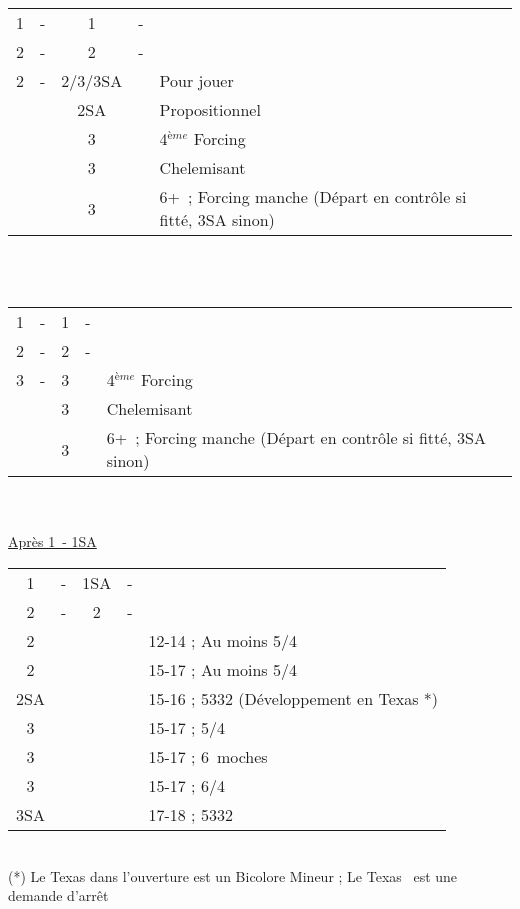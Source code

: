 \documentclass[a4paper, oneside, 11pt]{report}
\begin{document}
		\begin{tabular}{cccc|l}
		1\coeur & - & 1\pique & - &\\
		2\trefle & - & 2\carreau & - &\\
		2\coeur & - & 2\pique/3\trefle/3SA && Pour jouer\\
		&& 2SA && Propositionnel\\
		&& 3\carreau && 4$^{ème}$ Forcing\\
		&& 3\coeur && Chelemisant \coeur\\
		&& 3\pique && 6+\pique\ ; Forcing manche (Départ en contrôle si fitté, 3SA sinon)\\
		\end{tabular}\\\\

		\begin{tabular}{cccc|l}
		1\coeur & - & 1\pique & - &\\
		2\trefle & - & 2\carreau & - &\\
		3\trefle & - & 3\carreau && 4$^{ème}$ Forcing\\
		&& 3\coeur && Chelemisant \coeur\\
		&& 3\pique && 6+\pique\ ; Forcing manche (Départ en contrôle si fitté, 3SA sinon)\\
		\end{tabular}\\\\

		\underline{Après 1\coeur\ - 1SA}

		\begin{tabular}{cccc|l}
		1\coeur & - & 1SA & - &\\
		2\trefle & - & 2\carreau & - &\\
		2\coeur &&&& 12-14 ; Au moins 5\coeur/4\trefle\\
		2\pique &&&& 15-17 ; Au moins 5\coeur/4\pique\\
		2SA &&&& 15-16 ; 5332 (Développement en Texas *)\\
		3\trefle &&&& 15-17 ; 5\coeur/4\trefle\\
		3\carreau &&&& 15-17 ; 6\coeur\ moches\\
		3\coeur &&&& 15-17 ; 6\coeur/4\trefle\\
		3SA &&&& 17-18 ; 5332\\
		\end{tabular}\\
		(*) Le Texas dans l'ouverture est un Bicolore Mineur ; Le Texas \pique\ est une demande d'arrêt\\
\end{document}
